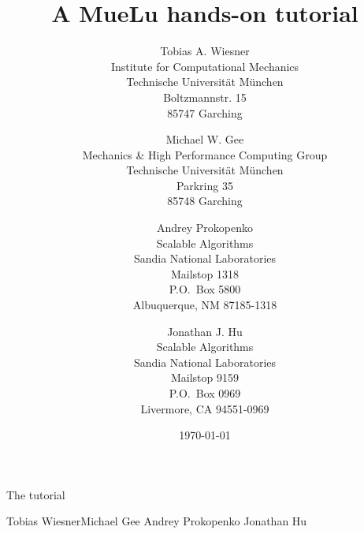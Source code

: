 \documentclass[10pt,fleqn]{book}
\title{A MueLu hands-on tutorial}
\author{Tobias A. Wiesner  \\
	Institute for Computational Mechanics \\
	Technische Universit\"at M\"unchen  \\
	Boltzmannstr. 15 \\
	85747 Garching
	\and
Michael W. Gee\\
Mechanics \& High Performance Computing Group \\
	Technische Universit\"at M\"unchen  \\
	Parkring 35 \\
	85748 Garching
	\and
Andrey Prokopenko \\
Scalable Algorithms \\
Sandia National Laboratories\\
Mailstop 1318 \\
P.O.~Box 5800 \\
Albuquerque, NM 87185-1318\\
\and
Jonathan J. Hu \\
Scalable Algorithms \\
Sandia National Laboratories\\
Mailstop 9159 \\
P.O.~Box 0969 \\
Livermore, CA 94551-0969
	}
\date{\today}
\begin{document}



\begingroup
\thispagestyle{empty}
\centering
\vspace*{9cm}
\par\normalfont\fontsize{35}{35}\sffamily\selectfont
The \muelu tutorial \par %
\vspace*{1cm}
{\Huge \parbox{10cm}{Tobias Wiesner\newline Michael Gee \newline Andrey Prokopenko \newline Jonathan Hu}}\par %
\endgroup
\end{document}
